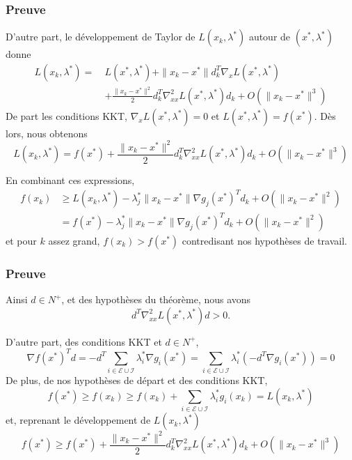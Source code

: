 \documentclass[usepdftitle=false,aspectratio=169]{beamer}
\def\cE{\mathcal{E}}
\def\cI{\mathcal{I}}
\begin{document}
\begin{frame}
\frametitle{Preuve}

D'autre part, le développement de Taylor de $L(x_k,\lambda^*)$ autour de $(x^*, \lambda^*)$ donne
\begin{align*}
L(x_k,\lambda^*) =\ & L(x^*,\lambda^*) + \| x_k - x^* \| d_k^T \nabla_x L(x^*,\lambda^*)
\\ & + \frac{ \| x_k - x^* \|^2 }{2} d_k^T \nabla^2_{xx} L(x^*,\lambda^*) d_k + O( \| x_k - x^* \|^3 )
\end{align*}
De part les conditions KKT, $\nabla_x L(x^*,\lambda^*) = 0$ et $L(x^*, \lambda^*) = f(x^*)$.
Dès lors, nous obtenons
$$
L(x_k,\lambda^*) = f(x^*) + \frac{ \| x_k - x^* \|^2 }{2} d_k^T \nabla^2_{xx} L(x^*,\lambda^*) d_k + O( \| x_k - x^* \|^3 )
$$

\mbox{}

En combinant ces expressions,
\begin{align*}
f(x_k) & \geq L(x_k, \lambda^*) - \lambda_j^*\| x_k - x^* \|\nabla g_j(x^*)^Td_k + O(\| x_k - x^* \|^2) \\
&= f(x^*) - \lambda_j^*\| x_k - x^* \|\nabla g_j(x^*)^Td_k + O(\| x_k - x^* \|^2)
\end{align*}
et pour $k$ assez grand, $f(x_k) > f(x^*)$ contredisant nos hypothèses de travail.
\end{frame}

\begin{frame}
\frametitle{Preuve}

Ainsi $d \in N^+$, et des hypothèses du théorème, nous avons 
$$
d^T \nabla_{xx}^2 L(x^*, \lambda^*) d > 0.
$$



D'autre part, des conditions KKT et $d \in N^+$,
$$
\nabla f(x^*)^Td = -d^T\sum_{i \in \cE \cup \cI} \lambda_i^* \nabla g_i(x^*)
= \sum_{i \in \cE \cup \cI} \lambda_i^* (-d^T \nabla g_i(x^*)) = 0
$$
De plus, de nos hypothèses de départ et des conditions KKT,
$$
f(x^*) \geq f(x_k) \geq f(x_k) + \sum_{i \in \cE \cup \cI} \lambda_i^* g_i(x_k) = L(x_k,\lambda^*)
$$
et, reprenant le développement de $L(x_k,\lambda^*)$
$$
f(x^*) \geq f(x^*) + \frac{ \| x_k - x^* \|^2 }{2} d_k^T \nabla^2_{xx} L(x^*,\lambda^*) d_k + O( \| x_k - x^* \|^3 )
$$
\end{frame}
\end{document}

